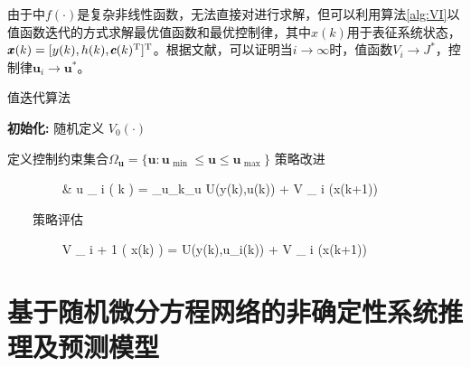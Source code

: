 由于中$f(\cdot)$是复杂非线性函数，无法直接对进行求解，但可以利用算法\ref{alg:VI}以值函数迭代的方式求解最优值函数和最优控制律，其中$x(k)$用于表征系统状态，$\pmb
x(k)=[y(k), h(k),\pmb c ( k )^{\rm T} ]^{\rm
T}$。根据文献\cite{Wang2012-GDHP}，可以证明当$i\rightarrow
\infty$时，值函数$V _ { i } \rightarrow J ^ { * }$，控制律$\pmb u _
{ i } \rightarrow \pmb u ^ { * }$。
\begin{algorithm}[hpbt]

\caption{值迭代算法} %
\label{alg:VI}
\hspace*{0.02in} {\bf 初始化:} %
随机定义 $V_0(\cdot)$
\begin{algorithmic}[1]
\State 定义控制约束集合$\Omega _ {\pmb u} = \{\pmb u:\pmb u _ {
\text {  min } } \leq \pmb u \leq \pmb u _ { \text {     max } }\}$
\State 策略改进
\begin{flalign}
　　　　\label{equ:VI_u}
        & \pmb u _ { i } \left( k \right) = \arg\min_{\pmb u_{k}\in \Omega_{\pmb u}} U(y(k),\pmb u(k)) + \gamma V _ { i } (\pmb x(k+1))
\end{flalign}
　　\State 策略评估
\begin{flalign}
\label{equ:VI_v} 　　　　    V _ { i + 1 } \left( \pmb x(k) \right)
= U(y(k),\pmb u_i(k)) + \gamma V _ { i } (\pmb x(k+1))
\end{flalign}
\EndFor

\end{algorithmic}
\end{algorithm}
\section{基于随机微分方程网络的非确定性系统推理及预测模型}

